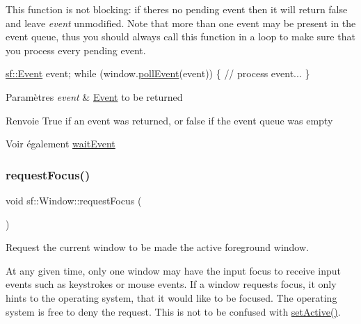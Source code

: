 This function is not blocking\+: if there\textquotesingle{}s no pending event then it will return false and leave {\itshape event} unmodified. Note that more than one event may be present in the event queue, thus you should always call this function in a loop to make sure that you process every pending event. 
\begin{DoxyCode}
\hyperlink{classsf_1_1Event}{sf::Event} event;
\textcolor{keywordflow}{while} (window.\hyperlink{classsf_1_1Window_a338e996585faf82e93069858e3b531b7}{pollEvent}(event))
\{
   \textcolor{comment}{// process event...}
\}
\end{DoxyCode}



\begin{DoxyParams}{Paramètres}
{\em event} & \hyperlink{classsf_1_1Event}{Event} to be returned\\
\hline
\end{DoxyParams}
\begin{DoxyReturn}{Renvoie}
True if an event was returned, or false if the event queue was empty
\end{DoxyReturn}
\begin{DoxySeeAlso}{Voir également}
\hyperlink{classsf_1_1Window_aaf02ab64fbc1d374eef3696df54137bc}{wait\+Event} 
\end{DoxySeeAlso}
\mbox{\label{classsf_1_1Window_a58cf7fa1775e8e7542032e3ecfa83b49}} 
\subsubsection{\texorpdfstring{request\+Focus()}{requestFocus()}}
{\footnotesize\ttfamily void sf\+::\+Window\+::request\+Focus (\begin{DoxyParamCaption}{ }\end{DoxyParamCaption})}



Request the current window to be made the active foreground window. 

At any given time, only one window may have the input focus to receive input events such as keystrokes or mouse events. If a window requests focus, it only hints to the operating system, that it would like to be focused. The operating system is free to deny the request. This is not to be confused with \hyperlink{classsf_1_1Window_aaab549da64cedf74fa6f1ae7a3cc79e0}{set\+Active()}.

